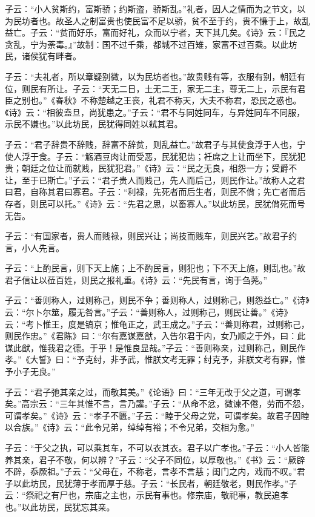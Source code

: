 \documentclass[]{article}
\begin{document}
子云：``小人贫斯约，富斯骄；约斯盗，骄斯乱。''礼者，因人之情而为之节文，以为民坊者也。故圣人之制富贵也使民富不足以骄，贫不至于约，贵不慊于上，故乱益亡。子云：``贫而好乐，富而好礼，众而以宁者，天下其几矣。《诗》云：『民之贪乱，宁为荼毒。』''故制：国不过千乘，都城不过百雉，家富不过百乘。以此坊民，诸侯犹有畔者。

子云：``夫礼者，所以章疑别微，以为民坊者也。''故贵贱有等，衣服有别，朝廷有位，则民有所让。子云：``天无二日，土无二王，家无二主，尊无二上，示民有君臣之别也。''《春秋》不称楚越之王丧，礼君不称天，大夫不称君，恐民之惑也。《诗》云：``相彼盍旦，尚犹患之。''子云：``君不与同姓同车，与异姓同车不同服，示民不嫌也。''以此坊民，民犹得同姓以弒其君。

子云：``君子辞贵不辞贱，辞富不辞贫，则乱益亡。''故君子与其使食浮于人也，宁使人浮于食。子云：``觞酒豆肉让而受恶，民犹犯齿；衽席之上让而坐下，民犹犯贵；朝廷之位让而就贱，民犹犯君。''《诗》云：``民之无良，相怨一方；受爵不让，至于已斯亡。''子云：``君子贵人而贱己，先人而后己，则民作让。''故称人之君曰君，自称其君曰寡君。子云：``利禄，先死者而后生者，则民不偝；先亡者而后存者，则民可以托。''《诗》云：``先君之思，以畜寡人。''以此坊民，民犹偝死而号无告。

子云：``有国家者，贵人而贱禄，则民兴让；尚技而贱车，则民兴艺。''故君子约言，小人先言。

子云：``上酌民言，则下天上施；上不酌民言，则犯也；下不天上施，则乱也。''故君子信让以莅百姓，则民之报礼重。《诗》云：``先民有言，询于刍荛。''

子云：``善则称人，过则称己，则民不争；善则称人，过则称己，则怨益亡。''《诗》云：``尔卜尔筮，履无咎言。''子云：``善则称人，过则称己，则民让善。''《诗》云：``考卜惟王，度是镐京；惟龟正之，武王成之。''子云：``善则称君，过则称己，则民作忠。''《君陈》曰：``尔有嘉谋嘉猷，入告尔君于内，女乃顺之于外，曰：此谋此猷，惟我君之德。于乎！是惟良显哉。''子云：``善则称亲，过则称己，则民作孝。''《大誓》曰：``予克纣，非予武，惟朕文考无罪；纣克予，非朕文考有罪，惟予小子无良。''

子云：``君子弛其亲之过，而敬其美。''《论语》曰：``三年无改于父之道，可谓孝矣。''高宗云：``三年其惟不言，言乃讙。''子云：``从命不忿，微谏不倦，劳而不怨，可谓孝矣。''《诗》云：``孝子不匮。''子云：``睦于父母之党，可谓孝矣。故君子因睦以合族。''《诗》云：``此令兄弟，绰绰有裕；不令兄弟，交相为愈。''

子云：``于父之执，可以乘其车，不可以衣其衣。君子以广孝也。''子云：``小人皆能养其亲，君子不敬，何以辨？''子云：``父子不同位，以厚敬也。''《书》云：``厥辟不辟，忝厥祖。''子云：``父母在，不称老，言孝不言慈；闺门之内，戏而不叹。''君子以此坊民，民犹薄于孝而厚于慈。子云：``长民者，朝廷敬老，则民作孝。''子云：``祭祀之有尸也，宗庙之主也，示民有事也。修宗庙，敬祀事，教民追孝也。''以此坊民，民犹忘其亲。
\end{document}
